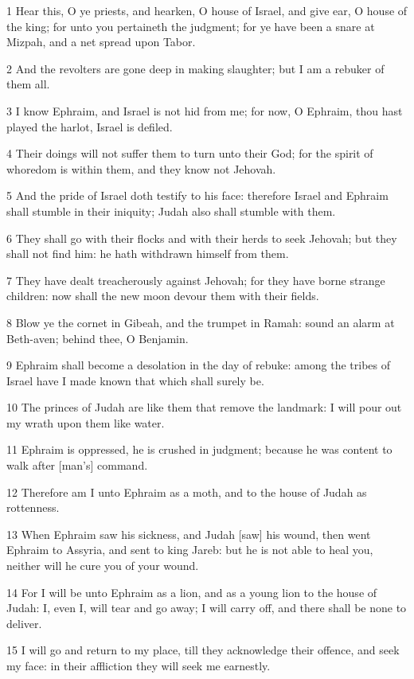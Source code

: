 \par 1 Hear this, O ye priests, and hearken, O house of Israel, and give ear, O house of the king; for unto you pertaineth the judgment; for ye have been a snare at Mizpah, and a net spread upon Tabor.
\par 2 And the revolters are gone deep in making slaughter; but I am a rebuker of them all.
\par 3 I know Ephraim, and Israel is not hid from me; for now, O Ephraim, thou hast played the harlot, Israel is defiled.
\par 4 Their doings will not suffer them to turn unto their God; for the spirit of whoredom is within them, and they know not Jehovah.
\par 5 And the pride of Israel doth testify to his face: therefore Israel and Ephraim shall stumble in their iniquity; Judah also shall stumble with them.
\par 6 They shall go with their flocks and with their herds to seek Jehovah; but they shall not find him: he hath withdrawn himself from them.
\par 7 They have dealt treacherously against Jehovah; for they have borne strange children: now shall the new moon devour them with their fields.
\par 8 Blow ye the cornet in Gibeah, and the trumpet in Ramah: sound an alarm at Beth-aven; behind thee, O Benjamin.
\par 9 Ephraim shall become a desolation in the day of rebuke: among the tribes of Israel have I made known that which shall surely be.
\par 10 The princes of Judah are like them that remove the landmark: I will pour out my wrath upon them like water.
\par 11 Ephraim is oppressed, he is crushed in judgment; because he was content to walk after [man's] command.
\par 12 Therefore am I unto Ephraim as a moth, and to the house of Judah as rottenness.
\par 13 When Ephraim saw his sickness, and Judah [saw] his wound, then went Ephraim to Assyria, and sent to king Jareb: but he is not able to heal you, neither will he cure you of your wound.
\par 14 For I will be unto Ephraim as a lion, and as a young lion to the house of Judah: I, even I, will tear and go away; I will carry off, and there shall be none to deliver.
\par 15 I will go and return to my place, till they acknowledge their offence, and seek my face: in their affliction they will seek me earnestly.

